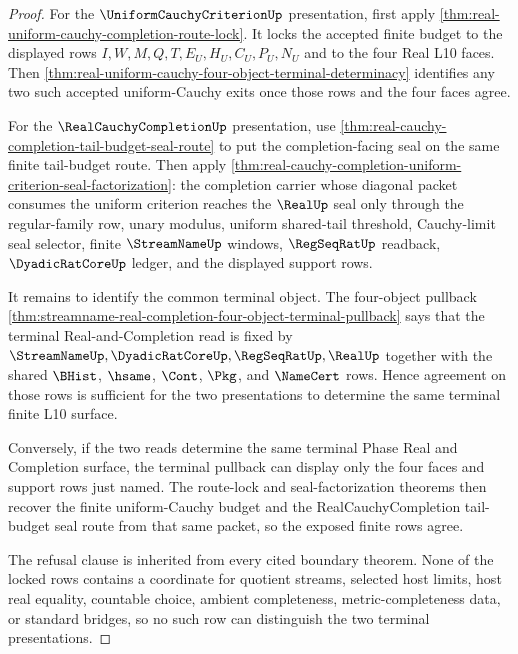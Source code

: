 \begin{proof}
For the $\UniformCauchyCriterionUp$ presentation, first apply
\autoref{thm:real-uniform-cauchy-completion-route-lock}. It locks the accepted
finite budget to the displayed rows $I,W,M,Q,T,E_U,H_U,C_U,P_U,N_U$ and to the
four Real L10 faces. Then
\autoref{thm:real-uniform-cauchy-four-object-terminal-determinacy} identifies
any two such accepted uniform-Cauchy exits once those rows and the four faces
agree.

For the $\RealCauchyCompletionUp$ presentation, use
\autoref{thm:real-cauchy-completion-tail-budget-seal-route} to put the
completion-facing seal on the same finite tail-budget route. Then apply
\autoref{thm:real-cauchy-completion-uniform-criterion-seal-factorization}: the
completion carrier whose diagonal packet consumes the uniform criterion reaches
the $\RealUp$ seal only through the regular-family row, unary modulus, uniform
shared-tail threshold, Cauchy-limit seal selector, finite $\StreamNameUp$
windows, $\RegSeqRatUp$ readback, $\DyadicRatCoreUp$ ledger, and the displayed
support rows.

It remains to identify the common terminal object. The four-object pullback
\autoref{thm:streamname-real-completion-four-object-terminal-pullback} says that
the terminal Real-and-Completion read is fixed by
$\StreamNameUp,\DyadicRatCoreUp,\RegSeqRatUp,\RealUp$ together with the shared
$\BHist$, $\hsame$, $\Cont$, $\Pkg$, and $\NameCert$ rows. Hence agreement on
those rows is sufficient for the two presentations to determine the same
terminal finite L10 surface.

Conversely, if the two reads determine the same terminal Phase Real and
Completion surface, the terminal pullback can display only the four faces and
support rows just named. The route-lock and seal-factorization theorems then
recover the finite uniform-Cauchy budget and the RealCauchyCompletion
tail-budget seal route from that same packet, so the exposed finite rows agree.

The refusal clause is inherited from every cited boundary theorem. None of the
locked rows contains a coordinate for quotient streams, selected host limits,
host real equality, countable choice, ambient completeness, metric-completeness
data, or standard bridges, so no such row can distinguish the two terminal
presentations.
\end{proof}

